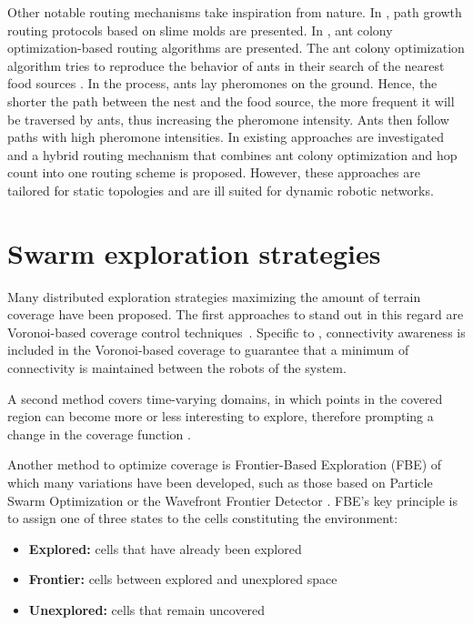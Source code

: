 Other notable routing mechanisms take inspiration from nature. In \cite{li2011slime,jiang2018toward}, path growth routing protocols based on slime molds are presented. In \cite{jiang2018effective,liao2008data}, ant colony optimization-based routing algorithms are presented. The ant colony optimization algorithm tries to reproduce the behavior of ants in their search of the nearest food sources \cite{dorigo1996ant}. In the process, ants lay pheromones on the ground. Hence, the shorter the path between the nest and the food source, the more frequent it will be traversed by ants, thus increasing the pheromone intensity. Ants then follow paths with high pheromone intensities. In \cite{liao2008data} existing approaches are investigated and a hybrid routing mechanism that combines ant colony optimization and hop count into one routing scheme is proposed. However, these approaches are tailored for static topologies and are ill suited for dynamic robotic networks.


\section{Swarm exploration strategies}
Many distributed exploration strategies maximizing the amount of
terrain coverage have been proposed. The first approaches to stand out
in this regard are Voronoi-based coverage control
techniques~\cite{arslan2016voronoi,luo2019voronoi}.
Specific to \cite{luo2019voronoi}, connectivity awareness is included in the Voronoi-based coverage to guarantee that a minimum of connectivity is maintained between the robots of the system. 

A second method covers time-varying domains, in which points in the
covered region can become more or less interesting to explore,
therefore prompting a change in the coverage function
\cite{santos2019decentralized,xu2019multi}. 

Another method to optimize coverage is Frontier-Based Exploration (FBE)
\cite{yamauchi1998frontier} of which many variations have been
developed, such as those based on Particle Swarm Optimization
\cite{wang2011frontier} or the Wavefront Frontier Detector
\cite{topiwala2018frontier}. FBE's key principle is to assign one of three states to the cells constituting the environment:

\begin{itemize}
\item \textbf{Explored:} cells that have already been explored
\item \textbf{Frontier:} cells between explored and unexplored space
\item \textbf{Unexplored:} cells that remain uncovered
\end{itemize}

